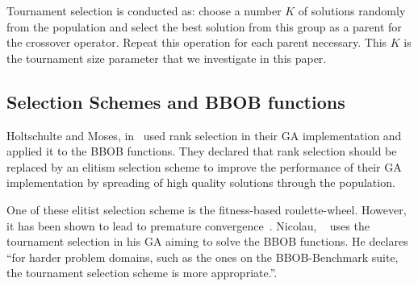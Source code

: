 Tournament selection is conducted as: choose a number $K$ of solutions randomly from the population and select the best solution from this group as a parent for the crossover operator. Repeat this operation for each parent necessary. This $K$ is the tournament size parameter that we investigate in this paper.
%
%
%	
%	
%		
%
%
%


\subsection{Selection Schemes and BBOB functions}


Holtschulte and Moses, in~\cite{holtschulte2013benchmarking} used rank selection in their GA implementation and applied it to the BBOB functions. They declared that rank selection should be replaced by an elitism selection scheme to improve the performance of their GA implementation by spreading of high quality solutions through the population. 

One of these elitist selection scheme is the fitness-based roulette-wheel. However, it has been shown to lead to premature convergence~\cite{baker1987reducing}. Nicolau, ~\cite{nicolau2009application} uses the tournament selection in his GA aiming to solve the BBOB functions. He declares ``for harder problem domains, such as the ones on the BBOB-Benchmark suite, the tournament selection scheme is more appropriate.''.

